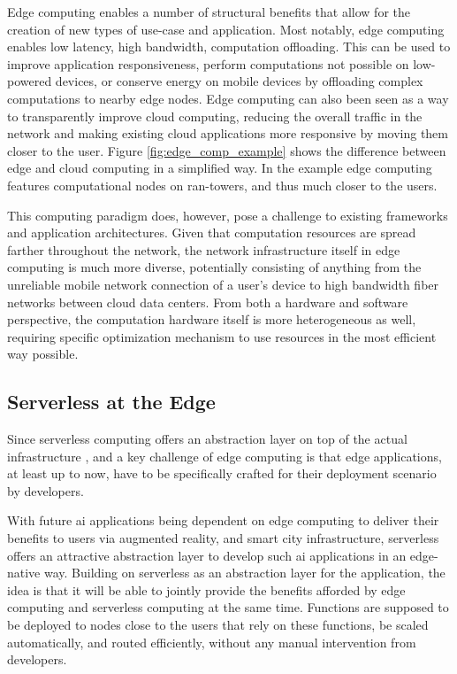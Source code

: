 Edge computing enables a number of structural benefits that allow for the creation of new types of use-case and application.
Most notably, edge computing enables low latency, high bandwidth, computation offloading.
This can be used to improve application responsiveness, perform computations not possible on low-powered devices, or conserve energy on mobile devices by offloading complex computations to nearby edge nodes\cite{abbasMobileEdgeComputing2018b}.
Edge computing can also been seen as a way to transparently improve cloud computing, reducing the overall traffic in the network and making existing cloud applications more responsive by moving them closer to the user\cite{satyanarayananEmergenceEdgeComputing2017}.
Figure \ref{fig:edge_comp_example} shows the difference between edge and cloud computing in a simplified way.
In the example edge computing features computational nodes on \gls{ran}-towers, and thus much closer to the users.


This computing paradigm does, however, pose a challenge to existing frameworks and application architectures.
Given that computation resources are spread  farther throughout the network, the network infrastructure itself in edge computing is much more diverse\cite{shiEdgeComputingVisionChallenges2016}, potentially consisting of anything from the unreliable mobile network connection of a user's device to high bandwidth fiber networks between cloud data centers.
From both a hardware and software perspective, the computation hardware itself is more heterogeneous as well, requiring specific optimization mechanism to use resources in the most efficient way possible\cite{abbasMobileEdgeComputing2018b}.

\subsection{Serverless at the Edge}
Since serverless computing offers an abstraction layer on top of the actual infrastructure \cite{jonasCloudProgrammingSimplified2019}, and a key challenge of edge computing is that edge applications, at least up to now, have to be specifically crafted for their deployment scenario by developers\cite{shiPromiseEdgeComputing2016}.

With future \gls{ai} applications being dependent on edge computing to deliver their benefits to users via augmented reality, and smart city infrastructure\cite{rauschEdgeIntelligenceConvergence2019}, serverless offers an attractive abstraction layer to develop such \gls{ai} applications in an edge-native way.
Building on serverless as an abstraction layer for the application, the idea is that it will be able to jointly provide the benefits afforded by edge computing and serverless computing at the same time.
Functions are supposed to be deployed to nodes close to the users that rely on these functions, be scaled automatically, and routed efficiently, without any manual intervention from developers.


